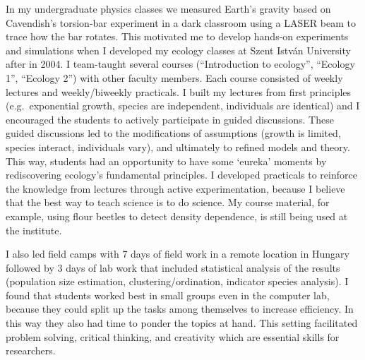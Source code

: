 In my undergraduate physics classes we measured Earth's gravity based on Cavendish's torsion-bar experiment in a dark classroom using a LASER beam to trace how the bar rotates. This motivated me to develop hands-on experiments and simulations when I developed my ecology classes at Szent Istv\'{a}n University after in 2004. I team-taught several courses (``Introduction to ecology'', ``Ecology 1'', ``Ecology 2'') with other faculty members. Each course consisted of weekly lectures and weekly/biweekly practicals. I built my lectures from first principles (e.g.~exponential growth, species are independent, individuals are identical) and I encouraged the students to actively participate in guided discussions. These guided discussions led to the modifications of assumptions (growth is limited, species interact, individuals vary), and ultimately to refined models and theory. This way, students had an opportunity to have some `eureka' moments by rediscovering ecology's fundamental principles. I developed practicals to reinforce the knowledge from lectures through active experimentation, because I believe that the best way to teach science is to do science. My course material, for example, using flour beetles to detect density dependence, is still being used at the institute. 
\vspace{0.5pc}

I also led field camps with 7 days of field work in a remote location in Hungary followed by 3 days of lab work  that included statistical analysis of the results (population size estimation, clustering/ordination, indicator species analysis). I found that students worked best in small groups even in the computer lab, because they could split up the tasks among themselves to increase efficiency. In this way they also had time to ponder the topics at hand. This setting facilitated problem solving, critical thinking, and creativity which are essential skills for researchers.
\vspace{0.5pc}

